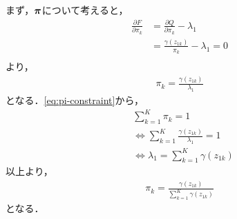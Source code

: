 まず，$\mbox{\boldmath $\pi$}$について考えると，
\begin{align}
  \frac{\partial F}{\partial \pi_k} &= \frac{\partial Q}{\partial \pi_k} - \lambda_1 \\
  &= \frac{\gamma(z_{1k})}{\pi_k} - \lambda_1= 0\\
\end{align}
より，
\begin{align}
  \pi_k = \frac{\gamma(z_{1k})}{\lambda_1}
\end{align}
となる．\eqref{eq:pi-constraint}から，
\begin{align}
  &\sum_{k=1}^K\pi_k = 1 \\
  &\Leftrightarrow \sum_{k=1}^K\frac{\gamma(z_{1k})}{\lambda_1} = 1 \\
  &\Leftrightarrow \lambda_1 = \sum_{k=1}^K\gamma(z_{1k})
\end{align}
以上より，
\begin{align}
  \pi_k = \frac{\gamma(z_{1k})}{\sum_{k=1}^K\gamma(z_{1k})} \label{eq:pi-max}
\end{align}
となる．

